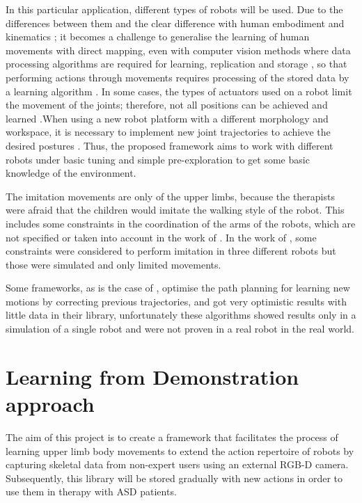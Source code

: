 \documentclass[thesis]{mas_proposal}
\begin{document}
    In this particular application, different types of robots will be used. Due to the differences between them and the clear difference with human embodiment and kinematics \cite{Koenemann2012}; it becomes a challenge to generalise the learning of human movements with direct mapping, even with computer vision methods where data processing algorithms are required for learning, replication and storage \cite{Liu2015}, so that performing actions through movements requires processing of the stored data by a learning algorithm \cite{Kober2010}. In some cases, the types of actuators used on a robot limit the movement of the joints; therefore, not all positions can be achieved and learned \cite{Almalki2020}.When using a new robot platform with a different morphology and workspace, it is necessary to implement new joint trajectories to achieve the desired postures \cite{VanPerre2015}. Thus, the proposed framework aims to work with different robots under basic tuning and simple pre-exploration to get some basic knowledge of the environment. 
    
    The imitation movements are only of the upper limbs, because the therapists were afraid that the children would imitate the walking style of the robot. This includes some constraints in the coordination of the arms of the robots, which are not specified or taken into account in the work of \cite{Liu2015, Fadli2018, Suleiman2008}. In the work of \cite{VanPerre2015}, some constraints were considered to perform imitation in three different robots but those were simulated and only limited movements.
    
    Some frameworks, as is the case of \cite{Berenson2012, Coleman2015}, optimise the path planning for learning new motions by correcting previous trajectories, and got very optimistic results with little data in their library, unfortunately these algorithms showed results only in a simulation of a single robot and were not proven in a real robot in the real world. 
    
\section{Learning from Demonstration approach}

    The aim of this project is to create a framework that facilitates the process of learning upper limb body movements to extend the action repertoire of robots by capturing skeletal data from non-expert users using an external RGB-D camera. Subsequently, this library will be stored gradually with new actions in order to use them in therapy with ASD patients.
    
\end{document}
